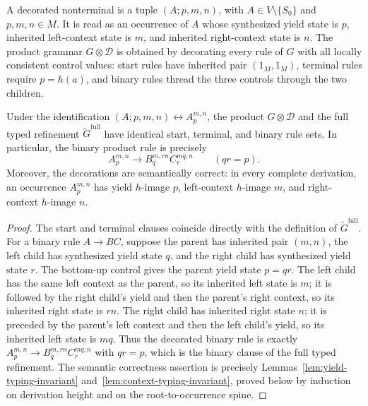\documentclass[sub]{jalc}
\newcommand{\eM}{1_M}
\newcommand{\Gfull}{\widetilde G^{\mathrm{full}}}
\begin{document}
A decorated nonterminal is a tuple \((A;p,m,n)\), with \(A\in V\setminus\{S_0\}\)
and \(p,m,n\in M\).  It is read as an occurrence of \(A\) whose synthesized
yield state is \(p\), inherited left-context state is \(m\), and inherited
right-context state is \(n\).  The product grammar \(G\otimes\mathcal D\) is
obtained by decorating every rule of \(G\) with all locally consistent control
values: start rules have inherited pair \((\eM,\eM)\), terminal rules require
\(p=h(a)\), and binary rules thread the three controls through the two children.

\begin{proposition}
\label{prop:barhillel-product}
Under the identification \((A;p,m,n)\leftrightarrow A_p^{m,n}\), the product
\(G\otimes\mathcal D\) and the full typed refinement \(\Gfull\) have identical
start, terminal, and binary rule sets.  In particular, the binary product rule
is precisely
\[
  A_p^{m,n}\to B_q^{m,rn}C_r^{mq,n}\qquad(qr=p).
\]
Moreover, the decorations are semantically correct: in every complete
derivation, an occurrence \(A_p^{m,n}\) has yield \(h\)-image \(p\), left-context
\(h\)-image \(m\), and right-context \(h\)-image \(n\).
\end{proposition}

\begin{proof}
The start and terminal clauses coincide directly with the definition of
\(\Gfull\).  For a binary rule \(A\to BC\), suppose the parent has inherited
pair \((m,n)\), the left child has synthesized yield state \(q\), and the right
child has synthesized yield state \(r\).  The bottom-up control gives the parent
yield state \(p=qr\).  The left child has the same left context as the parent,
so its inherited left state is \(m\); it is followed by the right child's yield
and then the parent's right context, so its inherited right state is \(rn\).  The
right child has inherited right state \(n\); it is preceded by the parent's left
context and then the left child's yield, so its inherited left state is \(mq\).
Thus the decorated binary rule is exactly
\(A_p^{m,n}\to B_q^{m,rn}C_r^{mq,n}\) with \(qr=p\), which is the binary clause
of the full typed refinement.  The semantic correctness assertion is precisely
Lemmas~\ref{lem:yield-typing-invariant} and~\ref{lem:context-typing-invariant},
proved below by induction on derivation height and on the root-to-occurrence
spine.
\end{proof}
\end{document}

